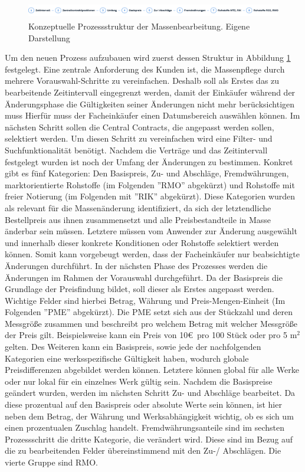 \begin{figure}[H]
    \centering
    \includegraphics[height=0.7cm]{Bilder/Praxisteil-Konzept-Prozess.png}
    \caption[Konzeptuelle Prozessstruktur der Massenbearbeitung]{Konzeptuelle Prozessstruktur der Massenbearbeitung. Eigene Darstellung}
    \label{fig:PraxisKonzeptProzess}
\end{figure}

Um den neuen Prozess aufzubauen wird zuerst dessen Struktur in Abbildung \ref{fig:PraxisKonzeptProzess} festgelegt. Eine zentrale Anforderung des Kunden ist, die Massenpflege durch mehrere Vorauswahl-Schritte zu vereinfachen. Deshalb soll als Erstes das zu bearbeitende Zeitintervall eingegrenzt werden, damit der Einkäufer während der Änderungsphase die Gültigkeiten seiner Änderungen nicht mehr berücksichtigen muss Hierfür muss der Facheinkäufer einen Datumsbereich auswählen können. Im nächsten Schritt sollen die Central Contracts, die angepasst werden sollen, selektiert werden. Um diesen Schritt zu vereinfachen wird eine Filter- und Suchfunktionalität benötigt. Nachdem die Verträge und das Zeitintervall festgelegt wurden ist noch der Umfang der Änderungen zu bestimmen. Konkret gibt es fünf Kategorien: Den Basispreis, Zu- und Abschläge, Fremdwährungen, marktorientierte Rohstoffe (im Folgenden ''RMO'' abgekürzt) und Rohstoffe mit freier Notierung (im Folgenden mit ''RIK'' abgekürzt). Diese Kategorien wurden als relevant für die Massenänderung identifiziert, da sich der letztendliche Bestellpreis aus ihnen zusammensetzt und alle Preisbestandteile in Masse änderbar sein müssen. Letztere müssen vom Anwender zur Änderung ausgewählt und innerhalb dieser konkrete Konditionen oder Rohstoffe selektiert werden können. Somit kann vorgebeugt werden, dass der Facheinkäufer nur beabsichtigte Änderungen durchführt. In der nächsten Phase des Prozesses werden die Änderungen im Rahmen der Vorauswahl durchgeführt. Da der Basispreis die Grundlage der Preisfindung bildet, soll dieser als Erstes angepasst werden. Wichtige Felder sind hierbei Betrag, Währung und Preis-Mengen-Einheit (Im Folgenden ''PME'' abgekürzt). Die PME setzt sich aus der Stückzahl und deren Messgrö\ss e zusammen und beschreibt pro welchem Betrag mit welcher Messgrö\ss e der Preis gilt. Beispielsweise kann ein Preis von 10\euro\ pro 100 Stück oder pro 5 m$^2$ gelten. Des Weiteren kann ein Basispreis, sowie jede der nachfolgenden Kategorien eine werksspezifische Gültigkeit haben, wodurch globale Preisdifferenzen abgebildet werden können. Letztere können global für alle Werke oder nur lokal für ein einzelnes Werk gültig sein. Nachdem die Basispreise geändert wurden, werden im nächsten Schritt Zu- und Abschläge bearbeitet. Da diese prozentual auf den Basispreis oder absolute Werte sein können, ist hier neben dem Betrag, der Währung und Werksabhängigkeit wichtig, ob es sich um einen prozentualen Zuschlag handelt. Fremdwährungsanteile sind im sechsten Prozessschritt die dritte Kategorie, die verändert wird. Diese sind im Bezug auf die zu bearbeitenden Felder übereinstimmend mit den Zu-/ Abschlägen. Die vierte Gruppe sind RMO. 